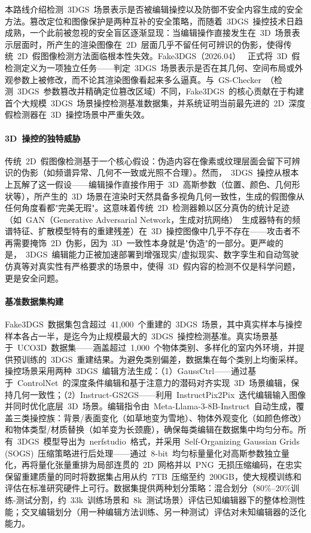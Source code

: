 本路线介绍检测~3DGS~场景表示是否被编辑操控以及防御不安全内容生成的安全方法。篡改定位和图像保护是两种互补的安全策略，而随着~3DGS~操控技术日趋成熟，一个此前被忽视的安全盲区逐渐显现：当编辑操作直接发生在~3D~场景表示层面时，所产生的渲染图像在~2D~层面几乎不留任何可辨识的伪影，使得传统~2D~假图像检测方法面临根本性失效。Fake3DGS（2026.04）~\cite{2604_27590} 正式将~3D~假检测定义为一项独立任务——判定~3DGS~场景表示是否在其几何、空间布局或外观参数上被修改，而不论其渲染图像看起来多么逼真。与~GS-Checker~（检测~3DGS~参数篡改并精确定位篡改区域）不同，Fake3DGS~的核心贡献在于构建首个大规模~3DGS~场景操控检测基准数据集，并系统证明当前最先进的~2D~深度假检测器在~3D~操控场景中严重失效。

\paragraph{3D~操控的独特威胁} 传统~2D~假图像检测基于一个核心假设：伪造内容在像素或纹理层面会留下可辨识的伪影（如频谱异常、几何不一致或光照不合理）。然而，~3DGS~操控从根本上瓦解了这一假设——编辑操作直接作用于~3D~高斯参数（位置、颜色、几何形状等），所产生的~3D~场景在渲染时天然具备多视角几何一致性，生成的假图像从任何角度看都"完美无瑕"。这意味着传统~2D~检测器赖以区分真伪的统计足迹（如~GAN（Generative Adversarial Network，生成对抗网络）~生成器特有的频谱特征、扩散模型特有的重建残差）在~3D~操控图像中几乎不存在——攻击者不再需要掩饰~2D~伪影，因为~3D~一致性本身就是"伪造"的一部分。更严峻的是，~3DGS~编辑能力正被加速部署到增强现实/虚拟现实、数字孪生和自动驾驶仿真等对真实性有严格要求的场景中，使得~3D~假内容的检测不仅是科学问题，更是安全问题。

\paragraph{基准数据集构建} Fake3DGS~数据集包含超过~41,000~个重建的~3DGS~场景，其中真实样本与操控样本各占一半，是迄今为止规模最大的~3DGS~操控检测基准。真实场景基于~UCO3D~数据集——涵盖超过~1,000~个物体类别、多样化的室内外环境，并提供预训练的~3DGS~重建结果。为避免类别偏差，数据集在每个类别上均衡采样。操控场景采用两种~3DGS~编辑方法生成：（1）GaussCtrl——通过基于~ControlNet~的深度条件编辑和基于注意力的潜码对齐实现~3D~场景编辑，保持几何一致性；（2）Instruct-GS2GS——利用~InstructPix2Pix~迭代编辑输入图像并同时优化底层~3D~场景。编辑指令由~Meta-Llama-3-8B-Instruct~自动生成，覆盖三类操控族：背景/表面变化（如草地变为雪地）、物体外观变化（如颜色修改）和物体类型/材质替换（如羊变为长颈鹿），确保每类编辑在数据集中均匀分布。所有~3DGS~模型导出为~nerfstudio~格式，并采用~Self-Organizing Gaussian Grids (SOGS)~压缩策略进行后处理——通过~8-bit~均匀标量量化对高斯参数独立量化，再将量化张量重排为局部连贯的~2D~网格并以~PNG~无损压缩编码，在忠实保留重建质量的同时将数据集占用从约~7TB~压缩至约~200GB，使大规模训练和评估在标准研究硬件上可行。数据集提供两种划分策略：混合划分（80\%--20\%训练-测试分割，约~33k~训练场景和~8k~测试场景）评估已知编辑器下的整体检测性能；交叉编辑划分（用一种编辑方法训练、另一种测试）评估对未知编辑器的泛化能力。

